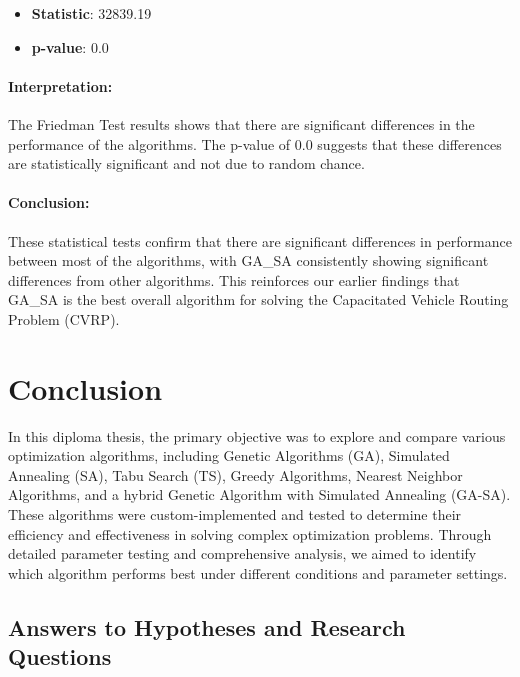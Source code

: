 \documentclass{article}
\begin{document}
    \begin{itemize}
        \item \textbf{Statistic}: 32839.19
        \item \textbf{p-value}: 0.0
    \end{itemize}

    \paragraph{Interpretation:}
    The Friedman Test results shows that there are significant differences in the performance of the algorithms.
    The p-value of 0.0 suggests that these differences are statistically significant and not due to random chance.

    \paragraph{Conclusion:}
    These statistical tests confirm that there are significant differences in performance between most of the algorithms, with GA\_SA consistently showing significant differences from other algorithms.
    This reinforces our earlier findings that GA\_SA is the best overall algorithm for solving the Capacitated Vehicle Routing Problem (CVRP).

    \newpage


    \section{Conclusion}

    In this diploma thesis, the primary objective was to explore and compare various optimization algorithms, including Genetic Algorithms (GA), Simulated Annealing (SA), Tabu Search (TS), Greedy Algorithms, Nearest Neighbor Algorithms, and a hybrid Genetic Algorithm with Simulated Annealing (GA-SA). These algorithms were custom-implemented and tested to determine their efficiency and effectiveness in solving complex optimization problems. Through detailed parameter testing and comprehensive analysis, we aimed to identify which algorithm performs best under different conditions and parameter settings.

    \subsection{Answers to Hypotheses and Research Questions}
\end{document}
